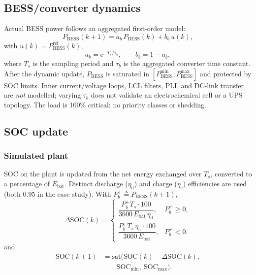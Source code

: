 \documentclass{ieeeaccess}
\begin{document}
\subsection{BESS/converter dynamics}
Actual BESS power follows an aggregated first-order model:
\begin{equation}
\label{eq:dyn}
P_{\mathrm{BESS}}(k+1)=a_b\,P_{\mathrm{BESS}}(k)+b_b\,u(k),
\end{equation}
with $u(k)=P_{\mathrm{BESS}}^{\mathrm{ref}}(k)$,
\begin{equation}
a_b=\mathrm{e}^{-T_s/\tau_b},\qquad b_b=1-a_b,
\end{equation}
where $T_s$ is the sampling period and $\tau_b$ is the aggregated converter time constant. After the dynamic update, $P_{\mathrm{BESS}}$ is saturated in $[P_{\mathrm{BESS}}^{\min},P_{\mathrm{BESS}}^{\max}]$ and protected by SOC limits. Inner current/voltage loops, LCL filters, PLL and DC-link transfer are \emph{not} modelled; varying $\tau_b$ does not validate an electrochemical cell or a UPS topology. The load is 100\% critical: no priority classes or shedding.

\subsection{SOC update}
\subsubsection{Simulated plant}
SOC on the plant is updated from the net energy exchanged over $T_s$, converted to a percentage of $E_{\mathrm{bat}}$. Distinct discharge ($\eta_{\mathrm{d}}$) and charge ($\eta_{\mathrm{c}}$) efficiencies are used (both $0.95$ in the case study). With $P_b^{+}\triangleq P_{\mathrm{BESS}}(k+1)$,
\begin{equation}
\label{eq:soc}
\Delta\mathrm{SOC}(k)=
\begin{cases}
\dfrac{P_b^{+}T_s\cdot 100}{3600\,E_{\mathrm{bat}}\,\eta_{\mathrm{d}}}, & P_b^{+}\ge 0,\\[6pt]
\dfrac{P_b^{+}T_s\,\eta_{\mathrm{c}}\cdot 100}{3600\,E_{\mathrm{bat}}}, & P_b^{+}< 0.
\end{cases}
\end{equation}
and
\begin{equation}
\begin{aligned}
\mathrm{SOC}(k+1)
&=\mathrm{sat}\bigl(\mathrm{SOC}(k)-\Delta\mathrm{SOC}(k),\\
&\qquad\mathrm{SOC}_{\min},\ \mathrm{SOC}_{\max}\bigr).
\end{aligned}
\end{equation}
\end{document}
